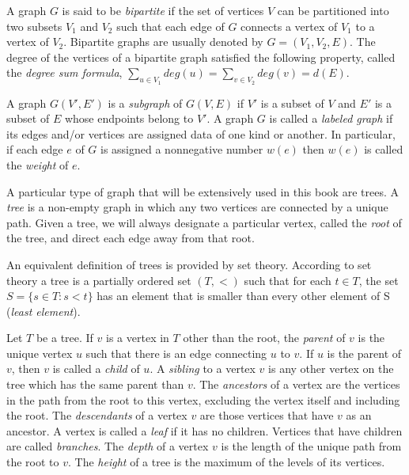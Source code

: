 A graph $G$ is said to be \emph{bipartite} if the set of vertices $V$ can be partitioned into two subsets $V_1$ and $V_2$ such that each edge of $G$ connects a vertex of $V_1$ to a vertex of $V_2$. Bipartite graphs are usually denoted by $G=(V_1, V_2, E)$. The degree of the vertices of a bipartite graph satisfied the following property, called the \emph{degree sum formula}, $\sum_{u \in V_1} deg(u) = \sum_{v \in V_2} deg(v) = d(E)$.

A graph $G(V',E')$ is a \emph{subgraph} of $G(V,E)$ if $V'$ is a subset of $V$ and $E'$ is a subset of $E$ whose endpoints belong to $V'$. A graph $G$ is called a \emph{labeled graph} if its edges and/or vertices are assigned data of one kind or another. In particular, if each edge $e$ of $G$ is assigned a nonnegative number $w(e)$ then $w(e)$ is called the \emph{weight} of $e$.

A particular type of graph that will be extensively used in this book are trees. A \emph{tree} is a non-empty graph in which any two vertices are connected by a unique path. Given a tree, we will always designate a particular vertex, called the \emph{root} of the tree, and direct each edge away from that root.

\begin{example}
An equivalent definition of trees is provided by set theory. According to set theory a tree is a partially ordered set $(T, <)$ such that for each $t \in T$, the set $S = \{ s \in T : s < t \}$ has an element that is smaller than every other element of S (\emph{least element}).
\end{example}

Let $T$ be a tree. If $v$ is a vertex in $T$ other than the root, the \emph{parent} of $v$ is the unique vertex $u$ such that there is an edge connecting $u$ to $v$. If $u$ is the parent of $v$, then $v$ is called a \emph{child} of $u$. A \emph{sibling} to a vertex $v$ is any other vertex on the tree which has the same parent than $v$. The \emph{ancestors} of a vertex are the vertices in the path from the root to this vertex, excluding the vertex itself and including the root. The \emph{descendants} of a vertex $v$ are those vertices that have $v$ as an ancestor. A vertex is called a \emph{leaf} if it has no children. Vertices that have children are called \emph{branches}. The \emph{depth} of a vertex $v$ is the length of the unique path from the root to $v$. The \emph{height} of a tree is the maximum of the levels of its vertices. 

